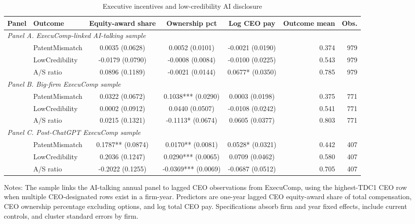 \begin{table}[!htbp]
\centering
\caption{Executive incentives and low-credibility AI disclosure}
\label{tab:exec_incentive_mismatch_v32}
\small
\begin{tabular}{llcccrr}
\hline
Panel & Outcome & Equity-award share & Ownership pct & Log CEO pay & Outcome mean & Obs. \\
\hline
\multicolumn{7}{l}{\textit{Panel A. ExecuComp-linked AI-talking sample}} \\
 & PatentMismatch & 0.0035 (0.0628) & 0.0052 (0.0101) & -0.0021 (0.0190) & 0.374 & 979 \\
 & LowCredibility & -0.0179 (0.0790) & -0.0008 (0.0084) & -0.0100 (0.0225) & 0.543 & 979 \\
 & A/S ratio & 0.0896 (0.1189) & -0.0021 (0.0144) & 0.0677* (0.0350) & 0.785 & 979 \\
\multicolumn{7}{l}{\textit{Panel B. Big-firm ExecuComp sample}} \\
 & PatentMismatch & 0.0322 (0.0672) & 0.1038*** (0.0290) & 0.0003 (0.0198) & 0.375 & 771 \\
 & LowCredibility & 0.0002 (0.0912) & 0.0440 (0.0507) & -0.0108 (0.0242) & 0.541 & 771 \\
 & A/S ratio & 0.0215 (0.1321) & -0.1113* (0.0674) & 0.0605 (0.0377) & 0.803 & 771 \\
\multicolumn{7}{l}{\textit{Panel C. Post-ChatGPT ExecuComp sample}} \\
 & PatentMismatch & 0.1787** (0.0874) & 0.0170** (0.0081) & 0.0528* (0.0321) & 0.442 & 407 \\
 & LowCredibility & 0.2036 (0.1247) & 0.0290*** (0.0065) & 0.0709 (0.0462) & 0.580 & 407 \\
 & A/S ratio & -0.2022 (0.1255) & -0.0369*** (0.0069) & -0.0687 (0.0512) & 0.705 & 407 \\
\hline
\end{tabular}
\begin{flushleft}
\footnotesize Notes: The sample links the AI-talking annual panel to lagged CEO observations from ExecuComp, using the highest-TDC1 CEO row when multiple CEO-designated rows exist in a firm-year. Predictors are one-year lagged CEO equity-award share of total compensation, CEO ownership percentage excluding options, and log total CEO pay. Specifications absorb firm and year fixed effects, include current controls, and cluster standard errors by firm.
\end{flushleft}
\end{table}
